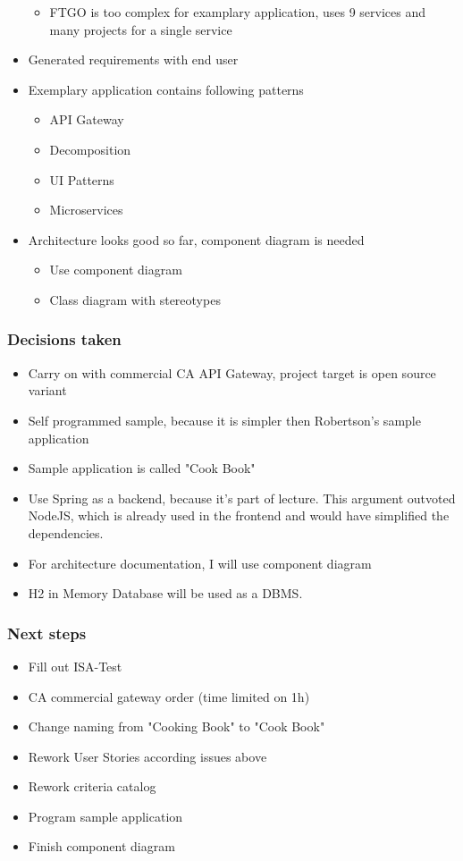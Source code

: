 \documentclass{article}
\begin{document}
\begin{itemize}
\begin{itemize}
        \item FTGO is too complex for examplary application, uses 9 services and many projects for a single service
    \end{itemize}
\item Generated requirements with end user
\item Exemplary application contains following patterns
    \begin{itemize}
        \item API Gateway
        \item Decomposition
        \item UI Patterns
        \item Microservices
    \end{itemize}
\item Architecture looks good so far, component diagram is needed
    \begin{itemize}
        \item Use component diagram
        \item Class diagram with stereotypes
    \end{itemize}
\end{itemize}

\subsubsection{Decisions taken}
\begin{itemize}
    \item Carry on with commercial CA API Gateway, project target is open source variant
    \item Self programmed sample, because it is simpler then Robertson's sample application
    \item Sample application is called "Cook Book"
    \item Use Spring as a backend, because it's part of lecture. This argument outvoted NodeJS, which is already used in the frontend and would have simplified the dependencies.
    \item For architecture documentation, I will use component diagram
    \item H2 in Memory Database will be used as a DBMS.
\end{itemize}

\subsubsection{Next steps}
\begin{itemize}
    \item Fill out ISA-Test
    \item CA commercial gateway order (time limited on 1h)
    \item Change naming from "Cooking Book" to "Cook Book"
    \item Rework User Stories according issues above
    \item Rework criteria catalog
    \item Program sample application
    \item Finish component diagram
\end{itemize}
\end{document}
